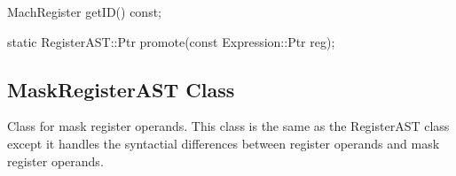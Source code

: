 \begin{apient}
  MachRegister getID() const;
\end{apient}

\begin{apient}
  static RegisterAST::Ptr promote(const Expression::Ptr reg);
\end{apient}


\subsection{MaskRegisterAST Class}
\label{sec:MaskRegisterAST}


Class for mask register operands. This class is the same as the RegisterAST
class except it handles the syntactial differences between register operands
and mask register operands.

